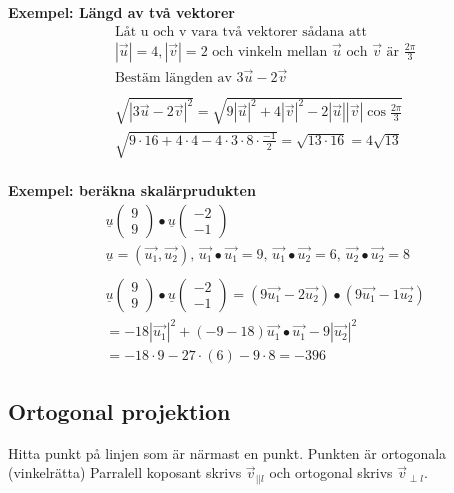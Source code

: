\begin{multicols}{2}
\textbf{Exempel: Längd av två vektorer}
\begin{align*}
  &\text{Låt u och v vara två vektorer sådana att} \\
  &|\vec{u}|=4, |\vec{v}|=2 \text{ och vinkeln mellan $\vec{u}$ och $\vec{v}$ är } \frac{2\pi}{3} \\
  &\text{Bestäm längden av } 3\vec{u}-2\vec{v} \\
  &\\
  &\sqrt{|3\vec{u}-2\vec{v}|^2} =
  \sqrt{ 9|\vec{u}|^2 + 4|\vec{v}|^2 - 2|\vec{u}||\vec{v}|\cos{\frac{2\pi}{3}}}  \\
  &\sqrt{9\cdot{}16 + 4\cdot{}4 - 4\cdot{}3\cdot{}8\cdot{\frac{-1}{2}} } =
  \sqrt{13\cdot{}16} = 4\sqrt{13} \\
\end{align*}

\textbf{Exempel: beräkna skalärprudukten}
\begin{align*}
  &\underline{u}\begin{pmatrix} 9 \\ 9 \end{pmatrix} \bullet
  \underline{u}\begin{pmatrix} -2 \\ -1 \end{pmatrix} \\
  &\underline{u}=(\vec{u_1},\vec{u_2}), \, \vec{u_1}\bullet\vec{u_1}=9, \,
  \vec{u_1}\bullet\vec{u_2}=6, \, \vec{u_2}\bullet\vec{u_2}=8 \\
  &\\
  &\underline{u}\begin{pmatrix} 9 \\ 9 \end{pmatrix} \bullet
  \underline{u}\begin{pmatrix} -2 \\ -1 \end{pmatrix} =
  (9\vec{u_1}-2\vec{u_2})\bullet(9\vec{u_1}-1\vec{u_2}) \\
  &=-18|\vec{u_1}|^2+(-9-18)\vec{u_1}\bullet\vec{u_1}-9|\vec{u_2}|^2 \\
  &= -18\cdot{9}-27\cdot(6)-9\cdot{8} =-396
\end{align*}


\subsection{Ortogonal projektion}
Hitta punkt på linjen som är närmast en punkt. Punkten är ortogonala (vinkelrätta) \newline
Parralell koposant skrivs $\vec{v}_{||{l}}$ och ortogonal skrivs $\vec{v}_{\perp{l}}$.


\end{multicols}
